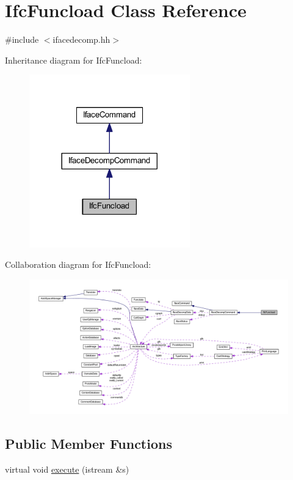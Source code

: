 \hypertarget{class_ifc_funcload}{}\section{Ifc\+Funcload Class Reference}
\label{class_ifc_funcload}


{\ttfamily \#include $<$ifacedecomp.\+hh$>$}



Inheritance diagram for Ifc\+Funcload\+:
\nopagebreak
\begin{figure}[H]
\begin{center}
\leavevmode
\includegraphics[width=197pt]{class_ifc_funcload__inherit__graph}
\end{center}
\end{figure}


Collaboration diagram for Ifc\+Funcload\+:
\nopagebreak
\begin{figure}[H]
\begin{center}
\leavevmode
\includegraphics[width=350pt]{class_ifc_funcload__coll__graph}
\end{center}
\end{figure}
\subsection*{Public Member Functions}
\begin{DoxyCompactItemize}
\item 
virtual void \mbox{\hyperlink{class_ifc_funcload_ae6dbe62903ed565fd45310e39b7dcb48}{execute}} (istream \&s)
\end{DoxyCompactItemize}
